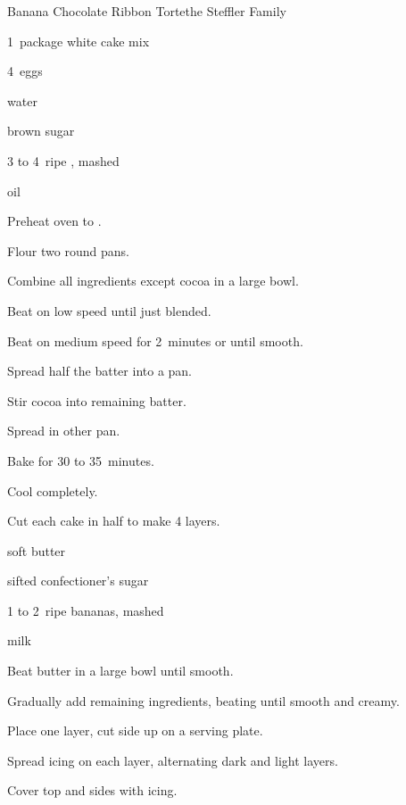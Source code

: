 \begin{recipe}{Banana Chocolate Ribbon Torte}{the Steffler Family}{}

\begin{ingredients}
\item 1~package white cake mix
\item 4~eggs
\item \C{\half} water
\item \C{\quarter} 
\item {} brown sugar
\item 3 to 4~ripe , mashed
\item \C{\third} oil
\end{ingredients}

\begin{directions}
\item Preheat oven to .
\item Flour two round pans.
\item Combine all ingredients except cocoa in a large bowl.
\item Beat on low speed until just blended.
\item Beat on medium speed for 2~minutes or until smooth.
\item Spread half the batter into a pan.
\item Stir cocoa into remaining batter.
\item Spread in other pan.
\item Bake for 30 to 35~minutes.
\item Cool completely.
\item Cut each cake in half to make 4 layers.
\end{directions}


\begin{ingredients}
\item \C{\half} soft butter
\item {} sifted confectioner's sugar
\item 1 to 2~ripe bananas, mashed
\item {} milk
\end{ingredients}

\begin{directions}
\item Beat butter in a large bowl until smooth.
\item Gradually add remaining ingredients, beating until smooth and creamy.
\item Place one layer, cut side up on a serving plate.
\item Spread icing on each layer, alternating dark and light layers.
\item Cover top and sides with icing.
\end{directions}
\end{recipe}
